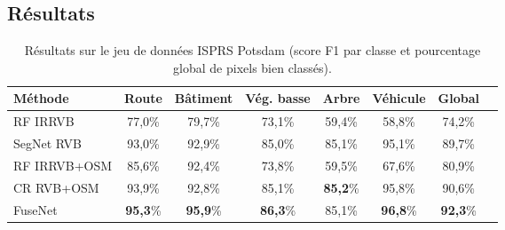 
\subsection{Résultats}

\begin{table}[t]
	\caption{Résultats sur le jeu de données \gls{ISPRS} Potsdam (score F1 par classe et pourcentage global de pixels bien classés).}
    \label{table_potsdam_results}
	\begin{tabularx}{\textwidth}{Y c c c c c c c}
    \toprule
    Méthode                 & Route     & Bâtiment& Vég. basse  & Arbre   & Véhicule & Global\\
    \midrule
    RF \gls{IRRVB}          & 77,0\%    & 79,7\%  & 73,1\%      & 59,4\%  & 58,8\%   & 74,2\%\\
    SegNet \gls{RVB}        & 93,0\%    &	92,9\%	&	85,0\%      &	85,1\%  &	95,1\%	 & 89,7\%\\
    \midrule
    RF \gls{IRRVB}+\gls{OSM}& 85,6\%    & 92,4\%  & 73,8\%      & 59,5\%  & 67,6\%   & 80,9\%\\
    CR \gls{RVB}+\gls{OSM}  &	93,9\%    &	92,8\%	&	85,1\%		  &	\textbf{85,2}\%    &	95,8\%	&	90,6\%\\
    FuseNet                 &	\textbf{95,3}\%	&	\textbf{95,9}\%	&	\textbf{86,3}\%	   &	85,1\%	&	\textbf{96,8}\%	&	\textbf{92,3}\%\\
    \bottomrule
    \end{tabularx}
\end{table}


